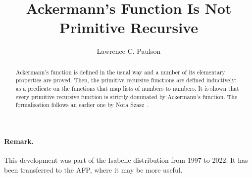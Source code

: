 \documentclass[11pt,a4paper]{article}
\begin{document}
\title{Ackermann's Function Is Not Primitive Recursive}
\author{Lawrence C. Paulson}
\maketitle

\begin{abstract}
Ackermann's function is defined in the usual way and a number of its elementary properties are proved.
Then, the primitive recursive functions are defined inductively: as a predicate on the functions that map lists of  numbers to numbers. It is shown that every primitive recursive function is strictly dominated by Ackermann's function. The formalisation follows an earlier one by Nora Szasz~\cite{szasz93}.
\end{abstract}

\newpage
\tableofcontents

\paragraph*{Remark.}
This development was part of the Isabelle distribution from 1997 to 2022. 
It has been transferred to the AFP, where it may be more useful.

\newpage





\end{document}
